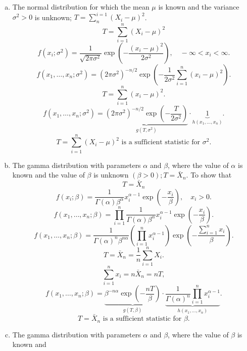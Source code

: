 \documentclass{article}
\begin{document}
\begin{enumerate}[(a)]
\[{		      }
	      \]
	\item The normal distribution for which the mean $\mu$ is known and the variance $\sigma^2>0$ is
	      unknown; $T = \sum_{n}^{i=1}(X_i - \mu)^2$.
	      \[
		      T = \sum_{i=1}^{n}(X_i-\mu)^2
	      \]
	      \[
		      f(x_i;\sigma^2)
		      = \frac{1}{\sqrt{2\pi\sigma^2}}
		      \exp\!\left(
		      -\frac{(x_i-\mu)^2}{2\sigma^2}
		      \right),
		      \quad -\infty<x_i<\infty.
	      \]
	      \[
		      f(x_1,\dots,x_n;\sigma^2)
		      =
		      (2\pi\sigma^2)^{-n/2}
		      \exp\!\left(
		      -\frac{1}{2\sigma^2}
		      \sum_{i=1}^{n}(x_i-\mu)^2
		      \right).
	      \]
	      \[
		      T = \sum_{i=1}^{n}(x_i-\mu)^2.
	      \]
	      \[
		      f(x_1,\dots,x_n;\sigma^2)
		      =
		      \underbrace{
			      (2\pi\sigma^2)^{-n/2}
			      \exp\!\left(-\frac{T}{2\sigma^2}\right)
		      }_{g(T,\sigma^2)}
		      \cdot
		      \underbrace{1}_{h(x_1,\dots,x_n)}.
	      \]
	      \[
		      \boxed{
			      T = \sum_{i=1}^{n}(X_i-\mu)^2
			      \text{ is a sufficient statistic for } \sigma^2.
		      }
	      \]
	\item The gamma distribution with parameters $\alpha$ and $\beta$, where the value of $\alpha$ is known and
	      the value of $\beta$ is unknown $(\beta>0);T= \bar{X}_n$.
	      To show that
	      \[
		      T = \bar{X}_n
	      \]
	      \[
		      f(x_i;\beta)
		      = \frac{1}{\Gamma(\alpha)\beta^{\alpha}}
		      x_i^{\alpha-1}
		      \exp\!\left(-\frac{x_i}{\beta}\right),
		      \quad x_i>0.
	      \]
	      \[
		      f(x_1,\dots,x_n;\beta)
		      =
		      \prod_{i=1}^{n}
		      \frac{1}{\Gamma(\alpha)\beta^{\alpha}}
		      x_i^{\alpha-1}
		      \exp\!\left(-\frac{x_i}{\beta}\right).
	      \]
	      \[
		      f(x_1,\dots,x_n;\beta)
		      =
		      \frac{1}{\Gamma(\alpha)^n \beta^{n\alpha}}
		      \left(\prod_{i=1}^{n} x_i^{\alpha-1}\right)
		      \exp\!\left(-\frac{\sum_{i=1}^{n} x_i}{\beta}\right).
	      \]
	      \[
		      T = \bar{X}_n = \frac{1}{n}\sum_{i=1}^{n} X_i.
	      \]
	      \[
		      \sum_{i=1}^{n} x_i = n\bar{X}_n = nT,
	      \]
	      \[
		      f(x_1,\dots,x_n;\beta)
		      =
		      \underbrace{
			      \beta^{-n\alpha}
			      \exp\!\left(-\frac{nT}{\beta}\right)
		      }_{g(T,\beta)}
		      \cdot
		      \underbrace{
		      \frac{1}{\Gamma(\alpha)^n}
		      \prod_{i=1}^{n} x_i^{\alpha-1}
		      }_{h(x_1,\dots,x_n)}.
	      \]
	      \[
		      \boxed{
			      T = \bar{X}_n
			      \text{ is a sufficient statistic for } \beta.
		      }
	      \]
	\item The gamma distribution with parameters $\alpha$ and $\beta$, where the value of $\beta$ is known and

\end{enumerate}
\end{document}
